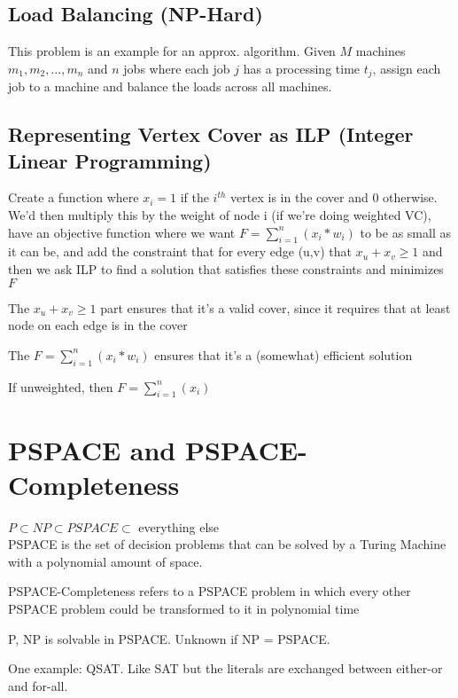 \documentclass{article}
\begin{document}
\subsection{Load Balancing (NP-Hard)}
This problem is an example for an approx. algorithm. Given $M$ machines $m_1, m_2, ..., m_n$ and $n$ jobs where each job $j$ has a processing time
$t_j$, assign each job to a machine and balance the loads across all machines.

\subsection{Representing Vertex Cover as ILP (Integer Linear Programming)}
Create a function where $x_i = 1$ if the $i^{th}$ vertex is in the cover and 0 otherwise. We'd then multiply this by the weight of node i (if we're doing 
weighted VC), have an objective function where we want $F = \sum_{i=1}^{n} (x_i * w_i)$ to be as small as it can be, and add the constraint 
that for every edge (u,v) that $x_u + x_v \geq 1$ and then we ask ILP to find a solution that satisfies these constraints and minimizes $F$ 

The $x_u + x_v \geq 1$ part ensures that it's a valid cover, since it requires that at least node on each edge is in the cover

The $F= \sum_{i=1}^{n} (x_i * w_i)$ ensures that it's a (somewhat) efficient solution

If unweighted, then $F= \sum_{i=1}^{n} (x_i )$ 

\section{PSPACE and PSPACE-Completeness}
$P \subset NP \subset PSPACE \subset $ everything else\\
PSPACE is the set of decision problems that can be solved by a Turing Machine with a polynomial amount of
space. 

PSPACE-Completeness refers to a PSPACE problem in which every other PSPACE problem could be transformed to it in 
polynomial time

P, NP is solvable in PSPACE. Unknown if NP = PSPACE.

One example: QSAT. Like SAT but the literals are exchanged between either-or and for-all.
\end{document}
